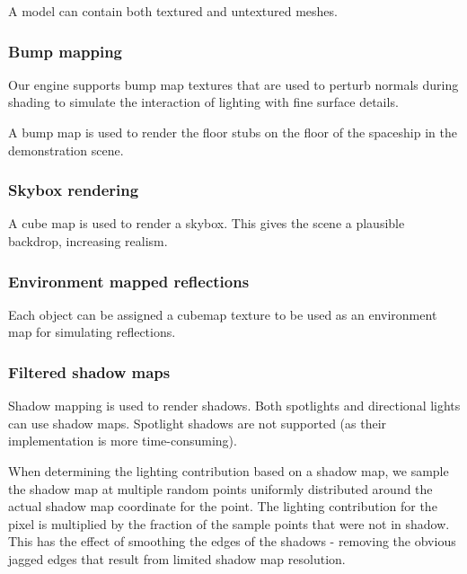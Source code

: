 \documentclass[11pt]{scrartcl} %
\begin{document}
            A model can contain both textured and untextured meshes.

        \subsubsection{Bump mapping}

            Our engine supports bump map textures that are used to perturb
            normals during shading to simulate the interaction of lighting with
            fine surface details.

            A bump map is used to render the floor stubs
            on the floor of the spaceship in the demonstration scene.

        \subsubsection{Skybox rendering}

            A cube map is used to render a skybox. This gives the scene a
            plausible backdrop, increasing realism.

        \subsubsection{Environment mapped reflections}

            Each object can be assigned a cubemap texture to be used as an
            environment map for simulating reflections.

        \subsubsection{Filtered shadow maps}

            Shadow mapping is used to render shadows. Both spotlights and
            directional lights can use shadow maps. Spotlight shadows are not
            supported (as their implementation is more time-consuming).

            When determining the lighting contribution based on a shadow map,
            we sample the shadow map at multiple random points uniformly
            distributed around the actual shadow map coordinate for the point.
            The lighting contribution for the pixel is multiplied by the
            fraction of the sample points that were not in shadow. This has the
            effect of smoothing the edges of the shadows - removing the obvious
            jagged edges that result from limited shadow map resolution.
\end{document}
